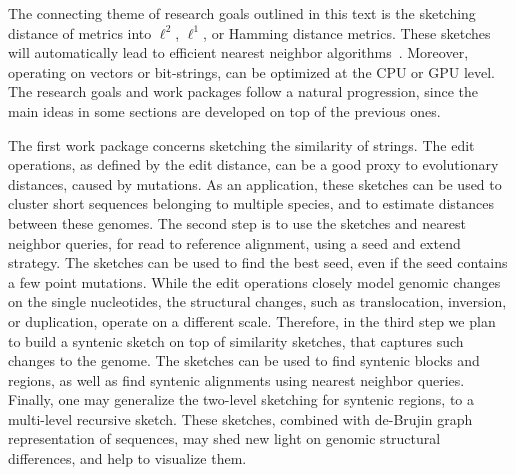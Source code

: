 The connecting theme of research goals outlined in this text is the sketching distance of metrics into $\ell^2$, $\ell^1$, or Hamming distance metrics. These sketches will automatically lead to efficient nearest neighbor algorithms~\cite{datar2004locality}. Moreover, operating on vectors or bit-strings, can be optimized at the CPU or GPU level. The research goals and work packages follow a natural progression, since the main ideas in some sections are developed on top of the previous ones. 


The first work package concerns sketching the similarity of strings. The edit operations, as defined by the edit distance, can be a good proxy to evolutionary distances, caused by mutations. As an application, these sketches can be used to cluster short sequences belonging to multiple species, and to estimate distances between these genomes. The second step is to use the sketches and nearest neighbor queries, for read to reference alignment, using a seed and extend strategy. The sketches can be used to find the best seed, even if the seed contains a few point mutations. While the edit operations closely model genomic changes on the single nucleotides, the structural changes, such as translocation, inversion, or duplication, operate on a different scale. Therefore, in the third step we plan to build a syntenic sketch on top of similarity sketches, that captures such changes to the genome. The sketches can be used to find syntenic blocks and regions, as well as find syntenic alignments using nearest neighbor queries. Finally, one may generalize the two-level sketching for syntenic regions, to a multi-level recursive sketch. These sketches, combined with de-Brujin graph representation of sequences, may shed new light on genomic structural differences, and help to visualize them. 

